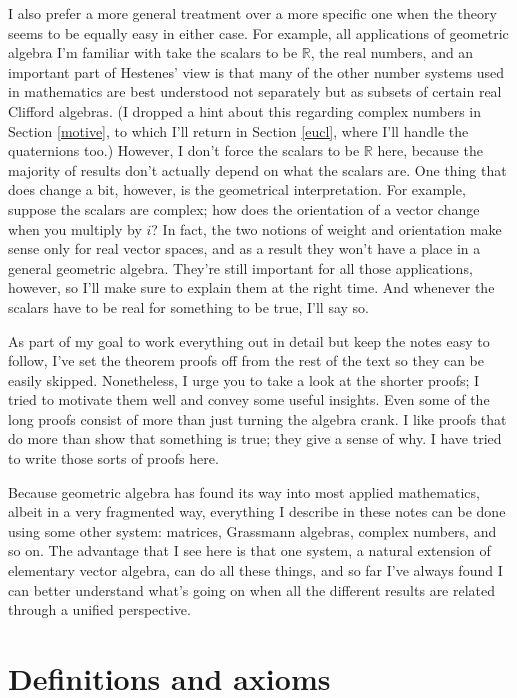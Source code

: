\documentclass{utarticle}
\begin{document}
I also prefer a more general treatment over a more specific one when the
theory seems to be equally easy in either case.  For example, all applications
of geometric algebra I'm familiar with take the scalars to be $\mathbb{R}$, the real
numbers, and an important part of Hestenes' view is that many of the other number 
systems used in mathematics are best understood not separately but as 
subsets of certain real Clifford algebras.  (I dropped a hint about this regarding 
complex numbers in Section \ref{motive}, to which I'll return in Section \ref{eucl}, where 
I'll handle the quaternions too.)  However, I don't force the scalars to be $\mathbb{R}$ 
here, because the majority of results don't actually depend on what the scalars are.  
One thing that does change a bit, however, is the geometrical interpretation.  
For example, suppose the scalars are complex; how does the orientation of a vector
change when you multiply by $i$?  In fact, the two notions of weight and orientation make sense
only for real vector spaces, and as a result they won't have a place in a general
geometric algebra.  They're still important for all those applications, however, so 
I'll make sure to explain them at the right time.  And whenever the scalars have to be real for 
something to be true, I'll say so.

As part of my goal to work everything out in detail but keep the notes easy to follow, 
I've set the theorem proofs off from the rest of the text so they can be easily skipped.  
Nonetheless, I urge you to take a look at the shorter proofs;  I tried to motivate
them well and convey some useful insights.  Even some of the long proofs consist of 
more than just turning the algebra crank.  I like proofs that do more than show that
something is true; they give a sense of why.  I have tried to write those sorts of proofs
here.

Because geometric algebra has found its way into most applied mathematics, albeit 
in a very fragmented way, everything I describe in these notes can be done using some other 
system: matrices, Grassmann algebras, complex numbers, and so on.  The advantage that 
I see here is that one system, a natural extension of elementary vector algebra, can do all 
these things, and so far I've always found I can better understand what's going on when all 
the different results are related through a unified perspective.  

\section{Definitions and axioms}
\label{axioms}
\end{document}
